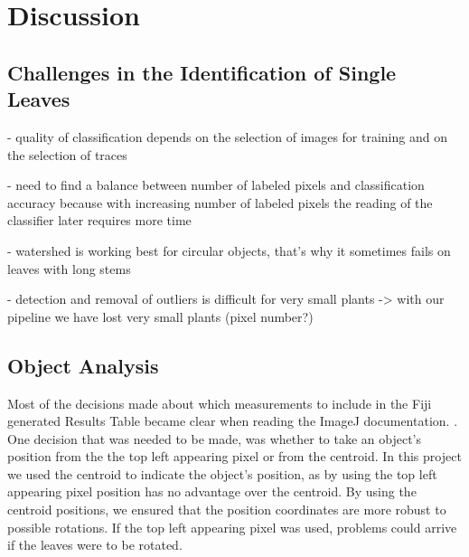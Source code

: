 \documentclass[paper=A4,bibliography=totocnumbered]{scrartcl}
\begin{document}
\section{Discussion}


\subsection{Challenges in the Identification of Single Leaves}
- quality of classification depends on the selection of images for training and on the selection of traces

- need to find a balance between number of labeled pixels and classification accuracy because with increasing number of labeled pixels the reading of the classifier later requires more time

- watershed is working best for circular objects, that's why it sometimes fails on leaves with long stems

- detection and removal of outliers is difficult for very small plants -> with our pipeline we have lost very small plants (pixel number?)

\subsection{Object Analysis}

Most of the decisions made about which measurements to include in the Fiji generated Results Table became clear when reading the ImageJ documentation. \citep{Ferreira.2012}. One decision that was needed to be made, was whether to take an object's position from the the top left appearing pixel or from the centroid. In this project we used the centroid to indicate the object's position, as by using the top left appearing pixel position has no advantage over the centroid. By using the centroid positions, we ensured that the position coordinates are more robust to possible rotations. If the top left appearing pixel was used, problems could arrive if the leaves were to be rotated. 
\end{document}
